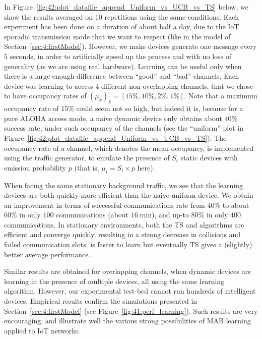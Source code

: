 In Figure~\ref{fig:42:plot_datafile_append_Uniform_vs_UCB_vs_TS} below, we show the results averaged on $10$ repetitions using the same conditions.
%
Each experiment has been done on a duration of about half a day,
due to the IoT sporadic transmission mode that we want to respect (like in the model of Section~\ref{sec:4:firstModel}).
However, we make devices generate one message every $5$ seconds, in order to artificially speed up the process and with no loss of generality (as we are using real hardware).
Learning can be useful only when there is a large enough difference between ``good'' and ``bad'' channels,
Each device was learning to access $4$ different non-overlapping channels, that we chose to have occupancy rates of $(\mu_k)_k = [15\%, 10\%, 2\%, 1\%]$.
Note that a maximum occupancy rate of $15\%$ could seem not so high, but indeed it is, because for a pure ALOHA access mode, a naive dynamic device only obtains about $40\%$ success rate, under such occupancy of the channels (see the ``uniform'' plot in Figure~\ref{fig:42:plot_datafile_append_Uniform_vs_UCB_vs_TS}).
%
The occupancy rate of a channel, which denotes the mean occupancy, is implemented using the traffic generator, to emulate the presence of $S_i$ static devices with emission probability $p$ (that is, $\mu_i = S_i \times p$ here).

When facing the same stationary background traffic, we see that the learning devices are both quickly more efficient than the naive uniform device.
We obtain an improvement in terms of successful communications rate from $40\%$ to about $60\%$ in only $100$ communications (about $16\;\mathrm{min}$), and up-to $80\%$ in only $400$ communications.
%
In stationary environments, both the TS and \UCB{} algorithms are efficient and converge quickly, resulting in a strong decrease in collisions and failed communication slots. \UCB{} is faster to learn but eventually TS gives a (slightly) better average performance.

Similar results are obtained for overlapping channels, when dynamic devices are learning in the presence of multiple devices, all using the same learning algorithm.
However, our experimental test-bed cannot run hundreds of intelligent devices.
Empirical results confirm the simulations presented in Section~\ref{sec:4:firstModel} (see Figure~\ref{fig:41:perf_learning}).
Such results are very encouraging, and illustrate well the various strong possibilities of MAB learning applied to IoT networks.

